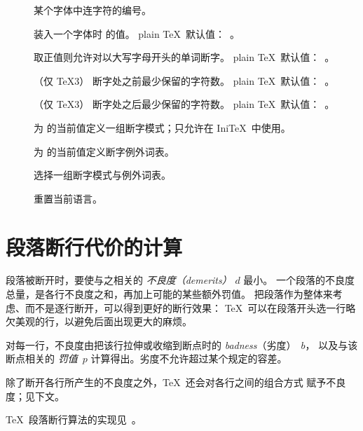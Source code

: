 \documentclass[a4paper]{rapport3}
\def\IniTeX{Ini\TeX}\def\LamsTeX{LAMS\TeX}\def\VirTeX{Vir\TeX}
\newenvironment{inventory}{\begin{description}}{\end{description}}
\begin{document}
\begin{inventory}
\item [] 
      某个字体中连字符的编号。

\item [] 
      装入一个字体时  的值。
      plain \TeX\ 默认值：~。

\item [] 
      取正值则允许对以大写字母开头的单词断字。
      plain \TeX\ 默认值：~。

\item [] 
      （仅 \TeX3）
      断字处之前最少保留的字符数。
      plain \TeX\ 默认值：~。

\item [] 
      （仅 \TeX3）
      断字处之后最少保留的字符数。
      plain \TeX\ 默认值：~。

\item [] 
      为  的当前值定义一组断字模式；只允许在 \IniTeX\ 中使用。

\item [] 
      为  的当前值定义断字例外词表。

\item [] 
      选择一组断字模式与例外词表。

\item [] 
      重置当前语言。

\end{inventory}


\section{段落断行代价的计算}

段落被断开时，要使与之相关的 {\em 不良度（demerits）\/} $d$ 最小。
一个段落的不良度总量，是各行不良度之和，再加上可能的某些额外罚值。
把段落作为整体来考虑、而不是逐行断开，可以得到更好的断行效果：
\TeX\ 可以在段落开头选一行略欠美观的行，以避免后面出现更大的麻烦。

对每一行，不良度由把该行拉伸或收缩到断点时的 {\em badness\/}（劣度）~$b$，
以及与该断点相关的 {\em 罚值\/}~$p$ 计算得出。劣度不允许超过某个规定的容差。

除了断开各行所产生的不良度之外，\TeX\ 还会对各行之间的组合方式
赋予不良度；见下文。

\mdqon
\mdqoff
\TeX\ 段落断行算法的实现见~\cite{K:break}。
\end{document}
